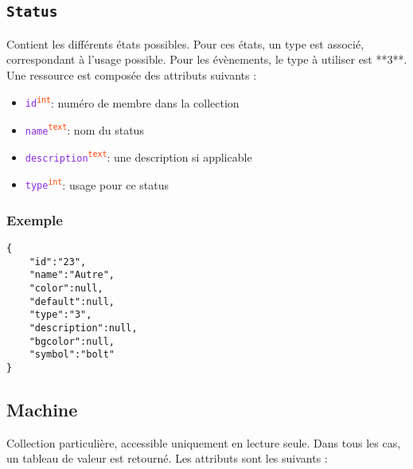 \documentclass[a4paper,twoside]{article}
\newcommand{\collection}[1]{\colorbox{light-gray}{\texttt{#1}}}
\newcommand{\attribut}[1]{\textcolor{BlueViolet}{\texttt{#1}}}
\newcommand{\type}[1]{\textcolor{OrangeRed}{\textsuperscript{\texttt{#1}}}}
\begin{document}
\subsection{\collection{Status}}

Contient les différents états possibles. Pour ces états, un type est associé, correspondant à l'usage possible. Pour les évènements, le type à utiliser est **3**. Une ressource est composée des attributs suivants :

\begin{itemize}
  \item \attribut{id}\type{int}: numéro de membre dans la collection
  \item \attribut{name}\type{text}: nom du status
  \item \attribut{description}\type{text}: une description si applicable
  \item \attribut{type}\type{int}: usage pour ce status
\end{itemize}

\subsubsection{Exemple}

\begin{verbatim}
{
	"id":"23",
	"name":"Autre",
	"color":null,
	"default":null,
	"type":"3",
	"description":null,
	"bgcolor":null,
	"symbol":"bolt"
}
\end{verbatim}

\subsection{Machine}

Collection particulière, accessible uniquement en lecture seule. Dans tous les cas, un tableau de valeur est retourné. Les attributs sont les suivants :
\end{document}
